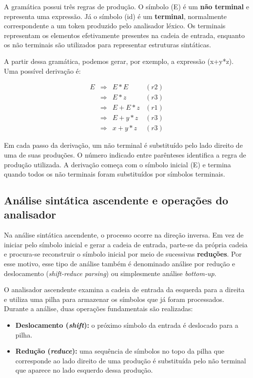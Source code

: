 \documentclass[
  brazilian,
  letterpaper,
]{book}
\providecommand{\tightlist}{%
  \setlength{\itemsep}{0pt}\setlength{\parskip}{0pt}}
\theoremstyle{plain}
\theoremstyle{definition}
\theoremstyle{remark}
\begin{document}
A gramática possui três regras de produção. O símbolo (E) é um
\textbf{não terminal} e representa uma expressão. Já o símbolo (id) é um
\textbf{terminal}, normalmente correspondente a um token produzido pelo
analisador léxico. Os terminais representam os elementos efetivamente
presentes na cadeia de entrada, enquanto os não terminais são utilizados
para representar estruturas sintáticas.

A partir dessa gramática, podemos gerar, por exemplo, a expressão
(x+y*z). Uma possível derivação é:

\[
\begin{array}{rcll}\
E &\Rightarrow & E * E & (r2)\\\
&\Rightarrow & E * z & (r3)\\\
&\Rightarrow & E + E * z & (r1)\\\
&\Rightarrow & E + y * z & (r3)\\\
&\Rightarrow & x + y * z & (r3)\
\end{array}
\]

Em cada passo da derivação, um não terminal é substituído pelo lado
direito de uma de suas produções. O número indicado entre parênteses
identifica a regra de produção utilizada. A derivação começa com o
símbolo inicial (E) e termina quando todos os não terminais foram
substituídos por símbolos terminais.

\subsection{Análise sintática ascendente e operações do
analisador}\label{anuxe1lise-sintuxe1tica-ascendente-e-operauxe7uxf5es-do-analisador}

Na análise sintática ascendente, o processo ocorre na direção inversa.
Em vez de iniciar pelo símbolo inicial e gerar a cadeia de entrada,
parte-se da própria cadeia e procura-se reconstruir o símbolo inicial
por meio de sucessivas \textbf{reduções}. Por esse motivo, esse tipo de
análise também é denominado análise por redução e deslocamento
(\emph{shift-reduce parsing}) ou simplesmente análise \emph{bottom-up}.

O analisador ascendente examina a cadeia de entrada da esquerda para a
direita e utiliza uma pilha para armazenar os símbolos que já foram
processados. Durante a análise, duas operações fundamentais são
realizadas:

\begin{itemize}
\tightlist
\item
  \textbf{Deslocamento (\emph{shift}):} o próximo símbolo da entrada é
  deslocado para a pilha.
\item
  \textbf{Redução (\emph{reduce}):} uma sequência de símbolos no topo da
  pilha que corresponde ao lado direito de uma produção é substituída
  pelo não terminal que aparece no lado esquerdo dessa produção.
\end{itemize}
\end{document}
